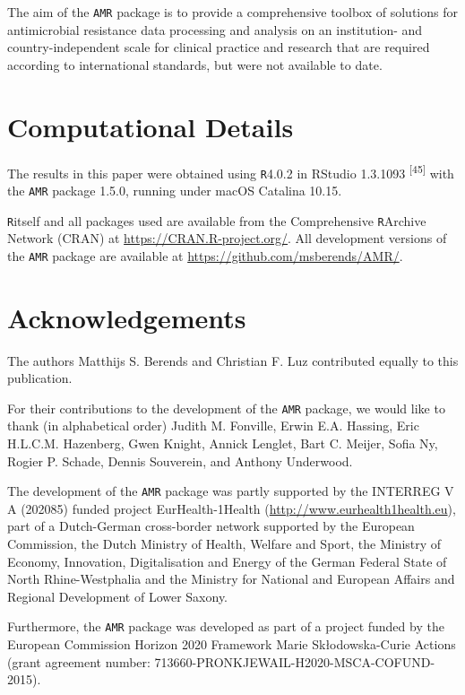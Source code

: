 \documentclass[
]{book}
\begin{document}
The aim of the \texttt{AMR} package is to provide a comprehensive toolbox of solutions for antimicrobial resistance data processing and analysis on an institution- and country-independent scale for clinical practice and research that are required according to international standards, but were not available to date.

\hypertarget{computational-details}{%
\section*{Computational Details}\label{computational-details}}

The results in this paper were obtained using \texttt{R}4.0.2 in RStudio 1.3.1093 \textsuperscript{{[}45{]}} with the \texttt{AMR} package 1.5.0, running under macOS Catalina 10.15.

\texttt{R}itself and all packages used are available from the Comprehensive \texttt{R}Archive Network (CRAN) at \url{https://CRAN.R-project.org/}. All development versions of the \texttt{AMR} package are available at \url{https://github.com/msberends/AMR/}.

\hypertarget{acknowledgements}{%
\section*{Acknowledgements}\label{acknowledgements}}

The authors Matthijs S. Berends and Christian F. Luz contributed equally to this publication.

For their contributions to the development of the \texttt{AMR} package, we would like to thank (in alphabetical order) Judith M. Fonville, Erwin E.A. Hassing, Eric H.L.C.M. Hazenberg, Gwen Knight, Annick Lenglet, Bart C. Meijer, Sofia Ny, Rogier P. Schade, Dennis Souverein, and Anthony Underwood.

The development of the \texttt{AMR} package was partly supported by the INTERREG V A (202085) funded project EurHealth-1Health (\url{http://www.eurhealth1health.eu}), part of a Dutch-German cross-border network supported by the European Commission, the Dutch Ministry of Health, Welfare and Sport, the Ministry of Economy, Innovation, Digitalisation and Energy of the German Federal State of North Rhine-Westphalia and the Ministry for National and European Affairs and Regional Development of Lower Saxony.

Furthermore, the \texttt{AMR} package was developed as part of a project funded by the European Commission Horizon 2020 Framework Marie Skłodowska-Curie Actions (grant agreement number: 713660-PRONKJEWAIL-H2020-MSCA-COFUND-2015).
\end{document}

